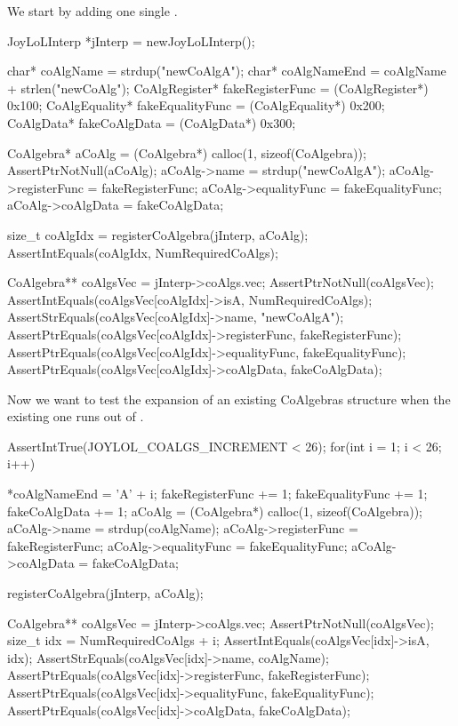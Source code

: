 
We start by adding one single . 

\startCTest
  JoyLoLInterp *jInterp = newJoyLoLInterp();

  char*          coAlgName        = strdup("newCoAlgA");
  char*          coAlgNameEnd     = coAlgName + strlen("newCoAlg");
  CoAlgRegister* fakeRegisterFunc = (CoAlgRegister*) 0x100;
  CoAlgEquality* fakeEqualityFunc = (CoAlgEquality*) 0x200;
  CoAlgData*     fakeCoAlgData    = (CoAlgData*)     0x300;
  
  CoAlgebra* aCoAlg    = (CoAlgebra*) calloc(1, sizeof(CoAlgebra));
  AssertPtrNotNull(aCoAlg);
  aCoAlg->name         = strdup("newCoAlgA");
  aCoAlg->registerFunc = fakeRegisterFunc;
  aCoAlg->equalityFunc = fakeEqualityFunc;
  aCoAlg->coAlgData    = fakeCoAlgData;
  
  size_t coAlgIdx = registerCoAlgebra(jInterp, aCoAlg);
  AssertIntEquals(coAlgIdx, NumRequiredCoAlgs);
  
  CoAlgebra** coAlgsVec = jInterp->coAlgs.vec;
  AssertPtrNotNull(coAlgsVec);
  AssertIntEquals(coAlgsVec[coAlgIdx]->isA, NumRequiredCoAlgs);
  AssertStrEquals(coAlgsVec[coAlgIdx]->name, "newCoAlgA");
  AssertPtrEquals(coAlgsVec[coAlgIdx]->registerFunc, fakeRegisterFunc);
  AssertPtrEquals(coAlgsVec[coAlgIdx]->equalityFunc, fakeEqualityFunc);
  AssertPtrEquals(coAlgsVec[coAlgIdx]->coAlgData,    fakeCoAlgData);
\stopCTest

Now we want to test the expansion of an existing CoAlgebras structure when 
the existing one runs out of . 

\startCTest
  AssertIntTrue(JOYLOL_COALGS_INCREMENT < 26);
  for(int i = 1; i < 26; i++) {
    *coAlgNameEnd        = 'A' + i;
    fakeRegisterFunc    += 1;
    fakeEqualityFunc    += 1;
    fakeCoAlgData       += 1;
    aCoAlg               = (CoAlgebra*) calloc(1, sizeof(CoAlgebra));
    aCoAlg->name         = strdup(coAlgName);
    aCoAlg->registerFunc = fakeRegisterFunc;
    aCoAlg->equalityFunc = fakeEqualityFunc;
    aCoAlg->coAlgData    = fakeCoAlgData;
    
    registerCoAlgebra(jInterp, aCoAlg);

    CoAlgebra** coAlgsVec = jInterp->coAlgs.vec;
    AssertPtrNotNull(coAlgsVec);
    size_t idx = NumRequiredCoAlgs + i;
    AssertIntEquals(coAlgsVec[idx]->isA, idx);
    AssertStrEquals(coAlgsVec[idx]->name, coAlgName);
    AssertPtrEquals(coAlgsVec[idx]->registerFunc, fakeRegisterFunc);
    AssertPtrEquals(coAlgsVec[idx]->equalityFunc, fakeEqualityFunc);
    AssertPtrEquals(coAlgsVec[idx]->coAlgData,    fakeCoAlgData);
  }
\stopCTest

